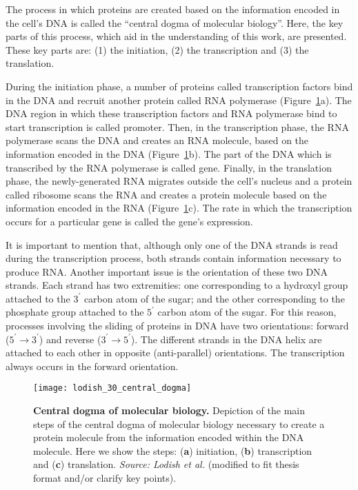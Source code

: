 The process in which proteins are created based on the information encoded in the cell's DNA is called the ``central dogma of molecular biology''. Here, the key parts of this process, which aid in the understanding of this work, are presented. These key parts are: (1) the initiation, (2) the transcription and (3) the translation.

During the initiation phase, a number of proteins called transcription factors bind in the DNA and recruit another protein called RNA polymerase (Figure~\ref{fig:lodish_central_dogma}a). The DNA region in which these transcription factors and RNA polymerase bind to start transcription is called promoter. Then, in the transcription phase, the RNA polymerase scans the DNA and creates an RNA molecule, based on the information encoded in the DNA (Figure~\ref{fig:lodish_central_dogma}b). The part of the DNA which is transcribed by the RNA polymerase is called gene. Finally, in the translation phase, the newly-generated RNA migrates outside the cell's nucleus and a protein called ribosome scans the RNA and creates a protein molecule based on the information encoded in the RNA (Figure~\ref{fig:lodish_central_dogma}c). The rate in which the transcription occurs for a particular gene is called the gene's expression.

It is important to mention that, although only one of the DNA strands is read during the transcription process, both strands contain information necessary to produce RNA. Another important issue is the orientation of these two DNA strands. Each strand has two extremities: one corresponding to a hydroxyl group attached to the $3^\prime$ carbon atom of the sugar; and the other corresponding to the phosphate group attached to the $5^\prime$ carbon atom of the sugar. For this reason, processes involving the sliding of proteins in DNA have two orientations: forward ($5^\prime \rightarrow 3^\prime$) and reverse ($3^\prime \rightarrow 5^\prime$). The different strands in the DNA helix are attached to each other in opposite (anti-parallel) orientations. The transcription always occurs in the forward orientation.

\begin{figure}[h!]
\centering
\texttt{[image: lodish\_30\_central\_dogma]}
\caption[Central dogma of molecular biology]{\textbf{Central dogma of molecular biology.} Depiction of the main steps of the central dogma of molecular biology necessary to create a protein molecule from the information encoded within the DNA molecule. Here we show the steps: (\textbf{a}) initiation, (\textbf{b}) transcription and (\textbf{c}) translation. \emph{Source: Lodish et al.}\cite{lodish2007} (modified to fit thesis format and/or clarify key points).}
\label{fig:lodish_central_dogma}
\end{figure}

